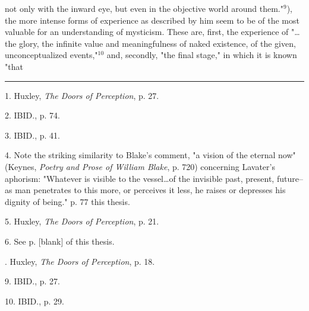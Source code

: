 not only with the inward eye, but even in the objective world around them."$^{9}$), the more intense
forms of experience as described by him seem to be of the most valuable for an understanding of mysticism. These are, first, the experience
of "\dots the glory, the infinite value and meaningfulness of naked existence, of the given, unconceptualized events,"$^{10}$
and, secondly, "the final stage," in which it is known "that\linebreak
\null\par
\vspace*{-\baselineskip}
\vspace*{\fill}
\noindent\rule{0.25\textwidth}{0.4pt}\par
1. Huxley, \textit{The Doors of Perception}, p. 27.\par
2. IBID., p. 74.\par
3. IBID., p. 41.\par
4. Note the striking similarity to Blake's comment, "a vision
of the eternal now" (Keynes, \textit{Poetry and Prose of William Blake}, p. 720) concerning
Lavater's aphorism: "Whatever is visible to the vessel\dots of the invisible past, present,
future--as man penetrates to this more, or perceives it less,
he raises or depresses his dignity of being." p. 77 this thesis.\par
5. Huxley, \textit{The Doors of Perception}, p. 21.\par
6. See p. [blank] of this thesis.\par
[7, 8]. Huxley, \textit{The Doors of Perception}, p. 18.\par
9. IBID., p. 27.\par
10. IBID., p. 29.\par

\newpage

